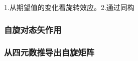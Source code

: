 
\begin{issues}
\issueDraft
1.从期望值的变化看旋转效应。2.通过同构
\end{issues}

\subsubsection{自旋对态矢作用}

\subsubsection{从四元数推导出自旋矩阵}
